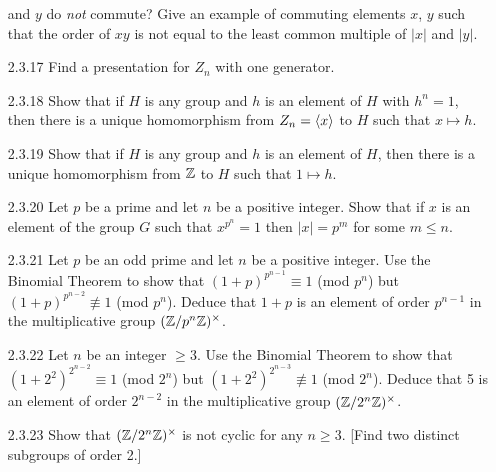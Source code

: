 \begin{enumerate}
                  and $y$ do \textit{not} commute? Give an example of commuting
                  elements $x$, $y$ such that the order of $xy$ is not equal to
                  the least common multiple of $|x|$ and $|y|$.
   \item[2.3.17]  Find a presentation for $Z_n$ with one generator.
   \item[2.3.18]  Show that if $H$ is any group and $h$ is an element of $H$
                  with $h^n = 1$, then there is a unique homomorphism from
                  $Z_n = \langle x \rangle$ to $H$ such that $x \mapsto h$.
   \item[2.3.19]  Show that if $H$ is any group and $h$ is an element of $H$,
                  then there is a unique homomorphism from $\mathbb{Z}$ to $H$ such that
                  $1 \mapsto h$.
   \item[2.3.20]  Let $p$ be a prime and let $n$ be a positive integer. Show
                  that if $x$ is an element of the group $G$ such that
                  $x^{p^n} = 1$ then $|x| = p^m$ for some $m \le n$.
   \item[2.3.21]  Let $p$ be an odd prime and let $n$ be a positive integer. Use
                  the Binomial Theorem to show that
                  $(1+p)^{p^{n-1}} \equiv 1$ (mod $p^n$) but
                  $(1+p)^{p^{n-2}} \not\equiv 1$ (mod $p^n$). Deduce that $1+p$
                  is an element of order $p^{n-1}$ in the multiplicative group
                  $(\mathbb{Z}/p^n\mathbb{Z})^\times$.
   \item[2.3.22]  Let $n$ be an integer $\ge 3$. Use the Binomial Theorem to
                  show that $(1+2^2)^{2^{n-2}} \equiv 1$ (mod $2^n$) but
                  $(1+2^2)^{2^{n-3}} \not\equiv 1$ (mod $2^n$). Deduce that 5 is
                  an element of order $2^{n-2}$ in the multiplicative group
                  $(\mathbb{Z}/2^n\mathbb{Z})^\times$.
   \item[2.3.23]  Show that $(\mathbb{Z}/2^n\mathbb{Z})^\times$ is not cyclic for any $n \ge 3$.
                  [Find two distinct subgroups of order 2.]

\end{enumerate}

